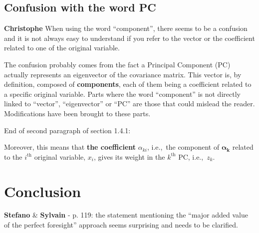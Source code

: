 \documentclass[12pt,a4paper]{article}
\def\ie{i.e.,\ }
\begin{document}
\begin{mdframed}[style=manuscript] %

\end{mdframed}


\subsection{Confusion with the word PC}
\label{Confusion_PC_wording}


\begin{mdframed}[style=comment] %
{\color{violet} \textbf{Christophe}} When using the word ``component'', there seems to be a confusion and it is not always easy to understand if you refer to the vector or the coefficient related to one of the original variable.
\end{mdframed}

\noindent The confusion probably comes from the fact a Principal Component (PC) actually represents an eigenvector of the covariance matrix. This vector is, by definition, composed of \textbf{components}, each of them being a coefficient related to a specific original variable. Parts where the word ``component'' is not directly linked to ``vector'', ``eigenvector'' or ``PC'' are those that could mislead the reader. Modifications have been brought to these parts.

{\color{blue} End of second paragraph of section 1.4.1}:

\begin{mdframed}[style=manuscript] %
Moreover, this means that \textbf{the coefficient} $\alpha_{ki}$, \ie the component of $\bm{\alpha}_{\mathbf{k}}$ related to the $i^{\text{th}}$ original variable, $x_i$,  gives its weight in the $k^{\text{th}}$ PC, \ie $z_k$. 
\end{mdframed}

\section{Conclusion}
\label{Conclusion}

\begin{mdframed}[style=comment] %
{\color{orange} \textbf{Stefano}} \& {\color{purple} \textbf{Sylvain}} - p. 119: the statement mentioning the ``major added value of the perfect foresight'' approach seems surprising and needs to be clarified. 
\end{mdframed}
\end{document}
